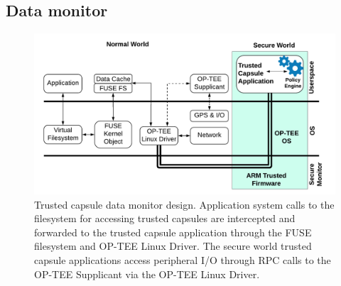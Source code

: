 \subsection{Data monitor}

\begin{figure}
  \centering
  \includegraphics[width=\columnwidth]{fig/Fig3_TC_data_monitor_system_cache.pdf}
  \caption{Trusted capsule data monitor design. Application system calls to the filesystem for accessing trusted capsules are intercepted and forwarded to the trusted capsule application through the FUSE filesystem and OP-TEE Linux Driver.
	The secure world trusted capsule applications access peripheral I/O through RPC calls to the OP-TEE Supplicant via the OP-TEE Linux Driver.}
  \label{fig:SystemModel}
\end{figure}

